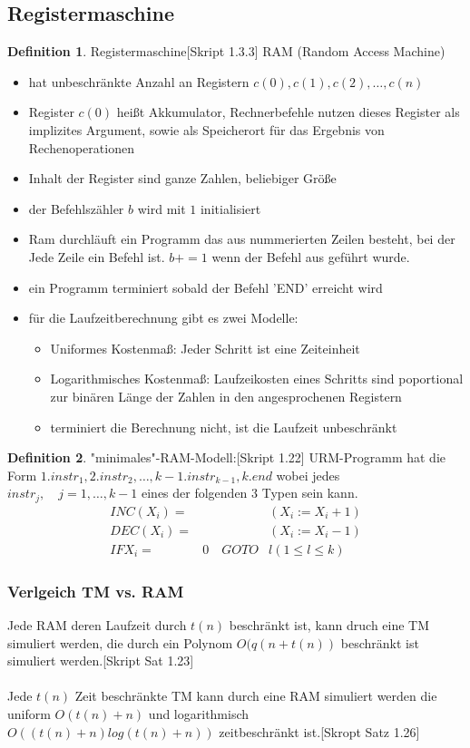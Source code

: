 \documentclass[a4paper, 10pt]{article}
\theoremstyle{definition}
\newtheorem{definition}{Definition}[section]
\begin{document}
\subsection{Registermaschine}
\begin{definition}{Registermaschine}[Skript 1.3.3]
RAM (Random Access Machine)\begin{itemize}
    \item hat unbeschränkte Anzahl an Registern $c(0),c(1),c(2),\dots,c(n)$
    \item Register $c(0)$ heißt Akkumulator, Rechnerbefehle nutzen dieses Register als implizites Argument, sowie als Speicherort für das Ergebnis von Rechenoperationen
    \item Inhalt der Register sind ganze Zahlen, beliebiger Größe
    \item der Befehlszähler $b$ wird mit $1$ initialisiert
    \item Ram durchläuft ein Programm das aus nummerierten Zeilen besteht, bei der Jede Zeile ein Befehl ist. $b+=1$ wenn der Befehl aus geführt wurde.
    \item ein Programm terminiert sobald der Befehl 'END' erreicht wird
    \item für die Laufzeitberechnung gibt es zwei Modelle:\begin{itemize}
        \item Uniformes Kostenmaß: Jeder Schritt ist eine Zeiteinheit
        \item Logarithmisches Kostenmaß: Laufzeikosten eines Schritts sind poportional zur binären Länge der Zahlen in den angesprochenen Registern 
        \item terminiert die Berechnung nicht, ist die Laufzeit unbeschränkt
    \end{itemize}
\end{itemize} 
\end{definition}
\begin{definition}{"minimales"-RAM-Modell:}[Skript 1.22]
URM-Programm hat die Form $1.instr_1,2.instr_2,\dots,k-1.instr_{k-1},k.end$ wobei jedes $instr_j,\quad j=1,\dots,k-1$ eines der folgenden 3 Typen sein kann.\begin{align}
    INC(X_i)=&\quad &(X_i:=X_i+1)\\
    DEC(X_i)=&\quad &(X_i:=X_i-1)\\
    IF X_i=& 0\quad GOTO &l(1\leq l\leq k)
\end{align}

\end{definition}
\subsubsection{Verlgeich TM vs. RAM}
Jede RAM deren Laufzeit durch $t(n)$ beschränkt ist, kann druch eine TM simuliert werden, die durch ein Polynom $O(q(n+t(n))$ beschränkt ist simuliert werden.[Skript Sat 1.23]\\ \\
Jede $t(n)$ Zeit beschränkte TM  kann durch eine RAM simuliert werden die uniform $O(t(n)+n)$ und logarithmisch \\$O((t(n)+n)log(t(n)+n))$ zeitbeschränkt ist.[Skropt Satz 1.26]
\end{document}
